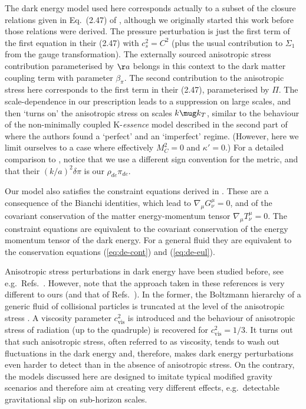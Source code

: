 The dark energy model used here corresponds actually to a subset of the closure 
relations given in Eq.\ (2.47) of  \cite{Sawicki:2012re}, although we originally 
started this work before those relations were derived. The pressure perturbation 
is just the first term of the first equation in their (2.47) with $c_s^2=C^2$ 
(plus the usual contribution to $\Sigma_1$ from the gauge transformation). The 
externally sourced anisotropic stress contribution parameterised by $\aa$ belongs 
in this context to the dark matter coupling term with parameter $\beta_\pi$. The 
second contribution to the anisotropic stress here corresponds to the first term 
in their (2.47), parameterised by $\Pi$. The scale-dependence in our prescription 
leads to a suppression on large scales, and then `turns on' the anisotropic 
stress on scales $k \mug k_T$, similar to the behaviour of the non-minimally 
coupled K-\emph{essence} model described in the second part of \cite{Sawicki:2012re} 
where the authors found a `perfect' and an `imperfect' regime. (However, 
here we limit ourselves to a case where effectively $M_C^2 = 0$ and $\kappa'=0$.) 
For a detailed comparison to \cite{Sawicki:2012re}, notice that we use a 
different sign convention for the metric, and that their $(k/a)^2 \delta\pi$ is 
our $\rho_{de} \pi_{de}$. 

Our model also satisfies the constraint equations derived in \cite{Baker:2012zs}. These are a consequence
of the Bianchi identities, which lead to $\nabla_\mu G^\mu_\nu=0$, and of the covariant 
conservation of the matter energy-momentum tensor $\nabla_\mu T^\mu_\nu=0$. The constraint
equations are equivalent to the covariant conservation of the energy momentum tensor of the
dark energy. For a general fluid they are equivalent to the conservation equations (\ref{eq:de-cont}) and (\ref{eq:de-eul}).

Anisotropic stress perturbations in dark energy have been studied
before, see e.g.\ Refs.\ \cite{Koivisto:2005mm, Mota:2007sz,
Sapone:2012nh, Sapone:2013wda}. However, note that the approach taken
in these references is very different to ours (and that of Refs.\
\cite{Kunz:2006ca, Song:2010rm}). In the former, the Boltzmann hierarchy of a
generic fluid of collisional particles is truncated at the level of
the anisotropic stress \cite{Hu:1998kj}. A viscosity parameter
$c_\text{vis}^2$ is introduced and the behaviour of anisotropic stress
of radiation (up to the quadruple) is recovered for
$c_\text{vis}^2=1/3$. It turns out that such anisotropic stress, often
referred to as viscosity, tends to wash out fluctuations in the dark
energy and, therefore, makes dark energy perturbations even harder to
detect than in the absence of anisotropic stress. On the contrary, the
models discussed here are designed to imitate typical modified gravity
scenarios and therefore aim at creating very different effects, e.g.\
detectable gravitational slip on sub-horizon scales.


